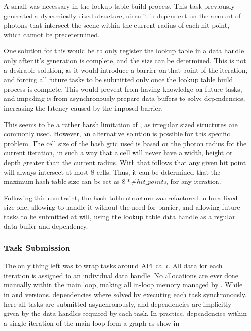 \documentclass[main.tex]{subfiles}
\begin{document}

A small was necessary in the lookup table build process. This task previously generated a dynamically sized structure, since it is dependent on the amount of photons that intersect the scene within the current radius of each hit point, which cannot be predetermined.

One solution for this would be to only register the lookup table in a \starpu data handle only after it's generation is complete, and the size can be determined. This is not a desirable solution, as it would introduce a barrier on that point of the iteration, and forcing all future tasks to be submitted only once the lookup table build process is complete. This would prevent \starpu from having knowledge on future tasks, and impeding it from asynchronously prepare data buffers to solve dependencies, increasing the latency caused by the imposed barrier.

This seems to be a rather harsh limitation of \starpu, as irregular sized structures are commonly used. However, an alternative solution is possible for this specific problem. The cell size of the hash grid used is based on the photon radius for the current iteration, in such a way that a cell will never have a width, height or depth greater than the current radius. With that follows that any given hit point will always intersect at most 8 cells. Thus, it can be determined that the maximum hash table size can be set as $8 * \#hit\_points$, for any iteration.

Following this constraint, the hash table structure was refactored to be a fixed-size one, allowing \starpu to handle it without the need for barrier, and allowing future tasks to be submitted at will, using the lookup table data handle as a regular data buffer and dependency.

\subsubsection{Task Submission}

The only thing left was to wrap tasks around \starpu API calls. All data for each iteration is assigned to an individual data handle. No allocations are ever done manually within the main loop, making all in-loop memory managed by \starpu. While in \cpu and \cuda versions, dependencies where solved by executing each task synchronously, here all tasks are submitted asynchronously, and dependencies are implicitly given by the data handles required by each task. In practice, dependencies within a single iteration of the main loop form a graph as show in 
\end{document}
